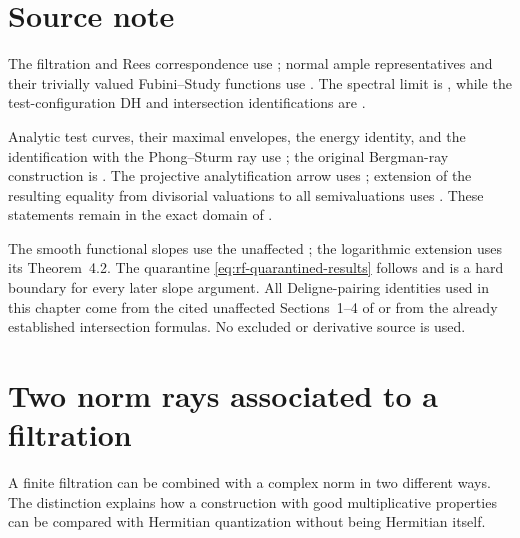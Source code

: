 \noindent\begin{minipage}{\linewidth}
\section*{Source note}
\label{sec:rf-source-note}

The filtration and Rees correspondence use
\cite[Section~1.2, Lemma~2.13, and Proposition~2.15]{BHJ17}; normal ample representatives and their trivially valued Fubini--Study functions use \cite[Proposition~2.30, Theorem~2.31, and Corollary~2.32]{BJ22}.  The spectral limit is \cite[Theorem~1.11 and Remark~1.12]{BC11}, while the test-configuration DH and intersection identifications are \cite[Propositions~3.12(iii) and~5.9]{BHJ17}.

Analytic test curves, their maximal envelopes, the energy identity, and the identification with the Phong--Sturm ray use \cite[Proposition~6.7, Lemmas~7.4 and~7.6, Proposition~7.11, Corollary~7.12, and Theorem~9.2]{RWN14}; the original Bergman-ray construction is \cite{PS07}.  The projective analytification arrow uses \cite[Theorem~3.12(i), Lemma~4.5, Definition~4.7, Proposition~4.8, and Lemma~4.10]{DXZ23}; extension of the resulting equality from divisorial valuations to all semivaluations uses \cite[Theorem~4.22 and Corollary~4.23]{BJ22}.  These statements remain in the exact domain of .

The smooth functional slopes use the unaffected \cite[Theorem~3.6 and Lemmas~3.9--3.11]{BHJ19}; the logarithmic extension uses its Theorem~4.2.
The quarantine \eqref{eq:rf-quarantined-results} follows
\cite{BHJ19err} and is a hard boundary for every later slope argument.
All Deligne-pairing identities used in this chapter come from the cited unaffected Sections~1--4 of \cite{BHJ19} or from the already established intersection formulas.  No excluded or derivative source is used.
\end{minipage}\par

\section{Two norm rays associated to a filtration}
\label{sec:rf-norm-envelope-rays}

A finite filtration can be combined with a complex norm in two
different ways. The distinction explains how a construction with
good multiplicative properties can be compared with Hermitian
quantization without being Hermitian itself.

